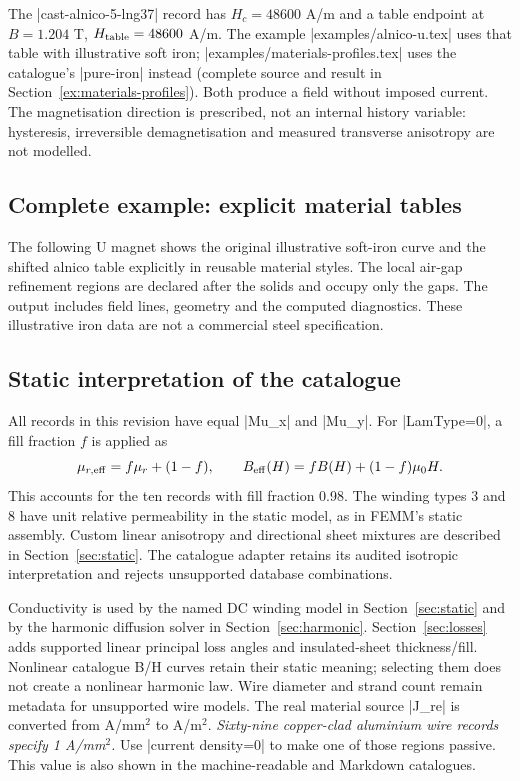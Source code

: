 The |cast-alnico-5-lng37| record has $H_c=48600$ A/m and a table endpoint
at $B=1.204$ T, $H_{\rm table}=48600$ A/m. The example
|examples/alnico-u.tex| uses that table with illustrative soft iron;
|examples/materials-profiles.tex| uses the catalogue's |pure-iron| instead
(complete source and result in Section~\ref{ex:materials-profiles}).
Both produce a field without imposed current. The magnetisation direction
is prescribed, not an internal history variable: hysteresis, irreversible
demagnetisation and measured transverse anisotropy are not modelled.

\subsection{Complete example: explicit material tables}
The following U magnet shows the original illustrative soft-iron curve
and the shifted alnico table explicitly in reusable material styles.
The local air-gap refinement regions are declared after the solids and
occupy only the gaps. The output includes field lines, geometry and the
computed diagnostics. These illustrative iron data are not a commercial
steel specification.

\subsection{Static interpretation of the catalogue}
All records in this revision have equal |Mu_x| and |Mu_y|. For |LamType=0|,
a fill fraction $f$ is applied as
\[
 \mu_{r,\rm eff}=f\mu_r+(1-f),\qquad
 B_{\rm eff}(H)=f B(H)+(1-f)\mu_0H.
\]
This accounts for the ten records with fill fraction 0.98. The winding
types 3 and 8 have unit relative permeability in the static model, as in
FEMM's static assembly. Custom linear anisotropy and directional sheet mixtures are described in
Section~\ref{sec:static}. The catalogue adapter retains its audited isotropic
interpretation and rejects unsupported database combinations.

Conductivity is used by the named DC winding model in
Section~\ref{sec:static} and by the harmonic diffusion solver in
Section~\ref{sec:harmonic}. Section~\ref{sec:losses} adds supported linear principal loss angles and
insulated-sheet thickness/fill. Nonlinear catalogue B/H curves retain their
static meaning; selecting them does not create a nonlinear harmonic law.
Wire diameter and strand count remain metadata for unsupported wire models. The real material source |J_re| is converted from A/mm$^2$ to A/m$^2$.
\emph{Sixty-nine copper-clad aluminium wire records specify 1 A/mm$^2$.}
Use |current density=0| to make one of those regions passive. This value
is also shown in the machine-readable and Markdown catalogues.

